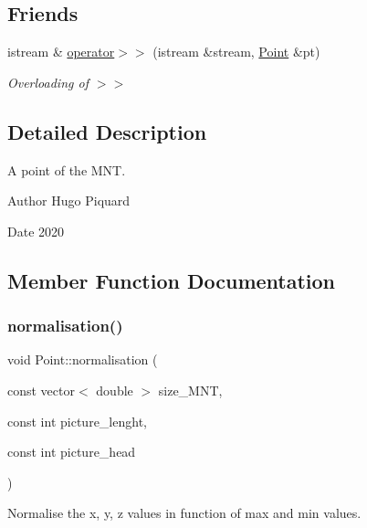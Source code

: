 \subsection*{Friends}
\begin{DoxyCompactItemize}
\item 
\mbox{\label{classPoint_a663f66d3a58c8e4308db9d642cbdf47f}} 
istream \& \hyperlink{classPoint_a663f66d3a58c8e4308db9d642cbdf47f}{operator$>$$>$} (istream \&stream, \hyperlink{classPoint}{Point} \&pt)
\begin{DoxyCompactList}\small\item\em Overloading of $>$$>$ \end{DoxyCompactList}\end{DoxyCompactItemize}


\subsection{Detailed Description}
A point of the M\+NT. 

\begin{DoxyAuthor}{Author}
Hugo Piquard 
\end{DoxyAuthor}
\begin{DoxyDate}{Date}
2020 
\end{DoxyDate}


\subsection{Member Function Documentation}
\mbox{\label{classPoint_a8726641b70376c3700b0b23f0bfff0ae}} 
\subsubsection{\texorpdfstring{normalisation()}{normalisation()}}
{\footnotesize\ttfamily void Point\+::normalisation (\begin{DoxyParamCaption}\item[{const vector$<$ double $>$}]{size\+\_\+\+M\+NT,  }\item[{const int}]{picture\+\_\+lenght,  }\item[{const int}]{picture\+\_\+head }\end{DoxyParamCaption})}



Normalise the x, y, z values in function of max and min values. 


